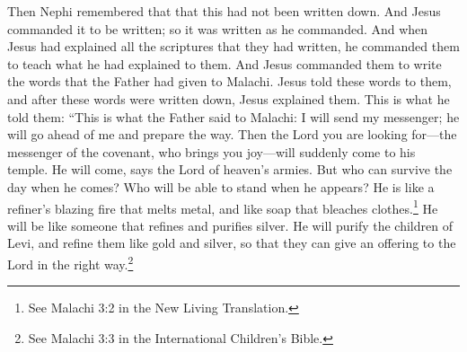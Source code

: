 Then Nephi remembered that that this had not been written down.
\bverse \iffalse And it came to pass that Jesus commanded that it should be written; therefore it was written according as he commanded. \fi
And Jesus commanded it to be written; so it was written as he commanded.
\bverse \iffalse And now it came to pass that when Jesus had expounded all the scriptures in one, which they had written, he commanded them that they should teach the things which he had expounded unto them. \fi
And when Jesus had explained all the scriptures that they had written, he commanded them to teach what he had explained to them.
\bchapter
\bverse \iffalse And it came to pass that he commanded them that they should write the words which the Father had given unto Malachi, which he should tell unto them. And it came to pass that after they were written he expounded them. And these are the words which he did tell unto them, saying: Thus said the Father unto Malachi--Behold, I will send my messenger, and he shall prepare the way before me, and the Lord whom ye seek shall suddenly come to his temple, even the messenger of the covenant, whom ye delight in; behold, he shall come, saith the Lord of Hosts. \fi
And Jesus commanded them to write the words that the Father had given to Malachi. Jesus told these words to them, and after these words were written down, Jesus explained them. This is what he told them: ``This is what the Father said to Malachi: I will send my messenger; he will go ahead of me and prepare the way. Then the Lord you are looking for---the messenger of the covenant, who brings you joy---will suddenly come to his temple. He will come, says the Lord of heaven's armies.
\bverse \iffalse But who may abide the day of his coming, and who shall stand when he appeareth? For he is like a refiner's fire, and like fuller's soap. \fi
But who can survive the day when he comes? Who will be able to stand when he appears? He is like a refiner's blazing fire that melts metal, and like soap that bleaches clothes.\footnote{See Malachi 3:2 in the New Living Translation.}
\bverse \iffalse And he shall sit as a refiner and purifier of silver; and he shall purify the sons of Levi, and purge them as gold and silver, that they may offer unto the Lord an offering in righteousness. \fi
He will be like someone that refines and purifies silver. He will purify the children of Levi, and refine them like gold and silver, so that they can give an offering to the Lord in the right way.\footnote{See Malachi 3:3 in the International Children's Bible.}
